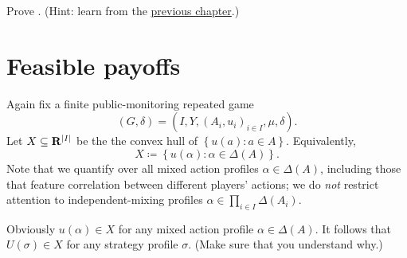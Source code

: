 \begin{exercise}
	\label{exercise:osdp_ppe}
	Prove . (Hint: learn from the \hyperref[ch_osdp]{previous chapter}.)
\end{exercise}



\section{Feasible payoffs}
\label{aps:feasible}

Again fix a finite public-monitoring repeated game
%
\begin{equation*}
	(G,\delta) = \left( I, Y, (A_i, u_i)_{i \in I}, \mu, \delta \right) .
\end{equation*}
%
Let $X \subseteq \R^{\abs*{I}}$ be the the convex hull of $\left\{ u(a) : a \in A \right\}$. Equivalently,
%
\begin{equation*}
	X \coloneqq \left\{
	u(\alpha) : \alpha \in \Delta(A)
	\right\} .
\end{equation*}
%
Note that we quantify over all mixed action profiles $\alpha \in \Delta(A)$, including those that feature correlation between different players' actions; we do \emph{not} restrict attention to independent-mixing profiles $\alpha \in \prod_{i \in I} \Delta(A_i)$.

Obviously $u(\alpha) \in X$ for any mixed action profile $\alpha \in \Delta(A)$. It follows that $U(\sigma) \in X$ for any strategy profile $\sigma$. (Make sure that you understand why.) 

